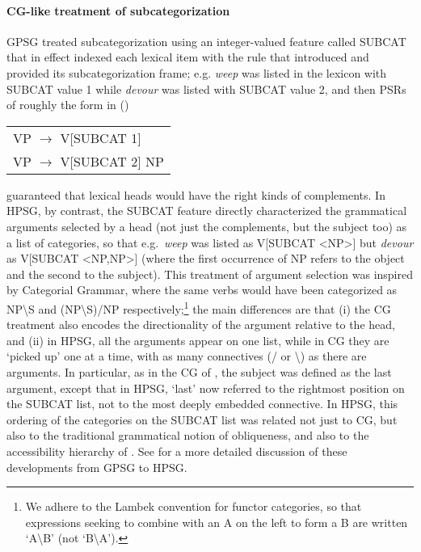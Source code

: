 \documentclass[output=paper]{langsci/langscibook}
\begin{document}
\paragraph*{CG-like treatment of subcategorization} GPSG treated subcategorization using an integer-valued feature called SUBCAT that in effect indexed each lexical item with the rule that introduced and provided its subcategorization frame; e.g. \emph{weep} was listed in the lexicon with SUBCAT value 1 while \emph{devour} was listed with SUBCAT value 2, and then PSRs of roughly the form in ()
\ea
\begin{tabular}{l}
          VP $\rightarrow$ V[SUBCAT 1] \\
          VP $\rightarrow$ V[SUBCAT 2] NP
\end{tabular}
\z

\noindent
guaranteed that lexical heads would have the right kinds of complements.  In HPSG, by contrast, the SUBCAT feature directly characterized the grammatical arguments selected by a head (not just the complements, but the subject too) as a list of categories, so that e.g.~\emph{weep} was listed as V[SUBCAT <NP>] but \emph{devour} as V[SUBCAT <NP,NP>] (where the first occurrence of NP refers to the object and the second to the subject). This treatment of argument selection was inspired by Categorial Grammar, where the same verbs would have been categorized as NP{\textbackslash}S and (NP{\textbackslash}S)/NP respectively;\footnote{We adhere to the Lambek convention for functor categories, so that expressions seeking to combine with an A on the left to form a B are written `A{\textbackslash}B' (not `B{\textbackslash}A').} the main differences are that (i) the CG treatment also encodes the directionality of the argument relative to the head, and (ii) in HPSG, all the arguments appear on one list, while in CG they are `picked up' one at a time, with as many
connectives (/ or \textbackslash) as there are arguments. In particular, as in the CG of \citet{Dowty82b-ohne-crossref}, the subject was defined as the last argument, except that in HPSG, `last' now referred to the rightmost position on the SUBCAT list, not to the most deeply embedded connective. In HPSG, this
ordering of the categories on the SUBCAT list was related not just to CG, but also to the traditional grammatical notion of obliqueness, and also to the accessibility hierarchy of \citet{KC77a}.  See \citet[Section 4]{MWArgSt} for a more detailed discussion of these developments from GPSG to HPSG.
\end{document}
